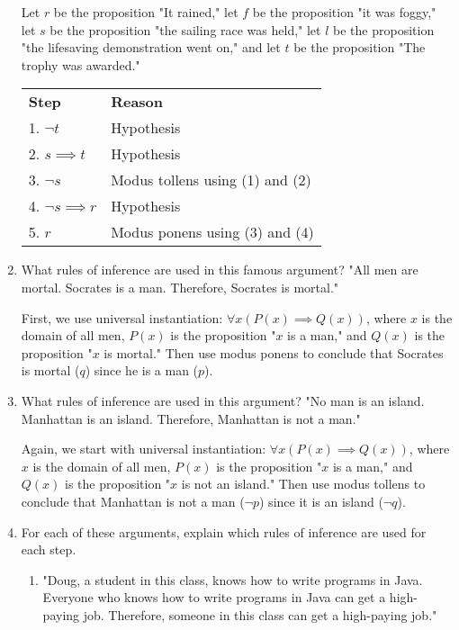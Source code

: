 \documentclass[11pt]{article}
\begin{document}
\begin{enumerate}[label=\textbf{\arabic*.}]
	Let $r$ be the proposition "It rained," let $f$ be the proposition "it was foggy," let $s$ be the proposition "the sailing race was held," let $l$ be the proposition "the lifesaving demonstration went on," and let $t$ be the proposition "The trophy was awarded."
	
	\begin{center}
	\begin{tabular}{ll}
		\textbf{Step} & \textbf{Reason} \\
		1. $\neg t$ & Hypothesis \\
		2. $s \implies t$ & Hypothesis \\
		3. $\neg s$ & Modus tollens using (1) and (2) \\
		4. $\neg s \implies r$ & Hypothesis \\
		5. $r$ & Modus ponens using (3) and (4)
	\end{tabular}
	\end{center}

	\item What rules of inference are used in this famous argument? "All men are mortal. Socrates is a man. Therefore, Socrates is mortal."
	
	First, we use universal instantiation: $\forall x(P(x) \implies Q(x))$, where $x$ is the domain of all men, $P(x)$ is the proposition "$x$ is a man," and $Q(x)$ is the proposition "$x$ is mortal." Then use modus ponens to conclude that Socrates is mortal ($q$) since he is a man ($p$).
	
	\item What rules of inference are used in this argument? "No man is an island. Manhattan is an island. Therefore, Manhattan is not a man."
	
	Again, we start with universal instantiation: $\forall x(P(x) \implies Q(x))$, where $x$ is the domain of all men, $P(x)$ is the proposition "$x$ is a man," and $Q(x)$ is the proposition "$x$ is not an island." Then use modus tollens to conclude that Manhattan is not a man ($\neg p$) since it is an island ($\neg q$).
	
	\item For each of these arguments, explain which rules of inference are used for each step.
	\begin{enumerate}[label=\textbf{\alph*)}]
		\item "Doug, a student in this class, knows how to write programs in Java. Everyone who knows how to write programs in Java can get a high-paying job. Therefore, someone in this class can get a high-paying job."
		

\end{enumerate}
\end{enumerate}
\end{document}
